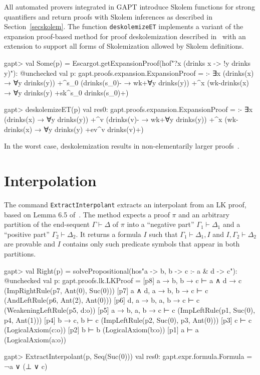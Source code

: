 \documentclass[a4paper,11pt]{book}
\newcommand{\seq}{\vdash}	%
\begin{document}
All automated provers integrated in GAPT introduce Skolem functions for strong
quantifiers and return proofs with Skolem inferences as described in
Section~\ref{secskolem}.  The function \texttt{deskolemizeET} implements a
variant of the expansion proof-based method for proof deskolemization
described in~\cite{Baaz2012Complexity} with an extension to support all forms
of Skolemization allowed by Skolem definitions.
\begin{clilisting}
  gapt> val Some(p) = Escargot.getExpansionProof(hof"?x (drinks x -> !y drinks y)"): @unchecked
  val p: gapt.proofs.expansion.ExpansionProof =
  :-
  ∃x (drinks(x) → ∀y drinks(y))
  +^{s_0} (drinks(s_0)- → wk+{∀y drinks(y)})
  +^{x} (wk-{drinks(x)} → ∀y drinks(y) +sk^{s_0} drinks(s_0)+)

  gapt> deskolemizeET(p)
  val res0: gapt.proofs.expansion.ExpansionProof =
  :-
  ∃x (drinks(x) → ∀y drinks(y))
  +^{v} (drinks(v)- → wk+{∀y drinks(y)})
  +^{x} (wk-{drinks(x)} → ∀y drinks(y) +ev^{v} drinks(v)+)

\end{clilisting}

In the worst case, deskolemization results in non-elementarily larger
proofs~\cite{Aguilera2016Unsound}.

\section{Interpolation}

The command \texttt{ExtractInterpolant} extracts an interpolant from an LK
proof, based on Lemma 6.5 of~\cite{Takeuti87Proof}.  The method expects a proof
$\pi$ and an arbitrary partition of the end-sequent $\Gamma \seq \Delta$ of
$\pi$ into a ``negative part'' $\Gamma_1\seq\Delta_1$ and a ``positive part''
$\Gamma_2 \seq \Delta_2$.  It returns a formula $I$ such that
$\Gamma_1\seq\Delta_1, I$ and $I,\Gamma_2\seq\Delta_2$ are provable and $I$
contains only such predicate symbols that appear in both partitions.

\begin{clilisting}
  gapt> val Right(p) = solvePropositional(hos"a -> b, b -> c :- a & d -> c"): @unchecked
  val p: gapt.proofs.lk.LKProof = [p8] a → b, b → c ⊢ a ∧ d → c    (ImpRightRule(p7, Ant(0), Suc(0)))
  [p7] a ∧ d, a → b, b → c ⊢ c    (AndLeftRule(p6, Ant(2), Ant(0)))
  [p6] d, a → b, a, b → c ⊢ c    (WeakeningLeftRule(p5, d:o))
  [p5] a → b, a, b → c ⊢ c    (ImpLeftRule(p1, Suc(0), p4, Ant(1)))
  [p4] b → c, b ⊢ c    (ImpLeftRule(p2, Suc(0), p3, Ant(0)))
  [p3] c ⊢ c    (LogicalAxiom(c:o))
  [p2] b ⊢ b    (LogicalAxiom(b:o))
  [p1] a ⊢ a    (LogicalAxiom(a:o))

  gapt> ExtractInterpolant(p, Seq(Suc(0)))
  val res0: gapt.expr.formula.Formula = ¬a ∨ (⊥ ∨ c)

\end{clilisting}
\end{document}
